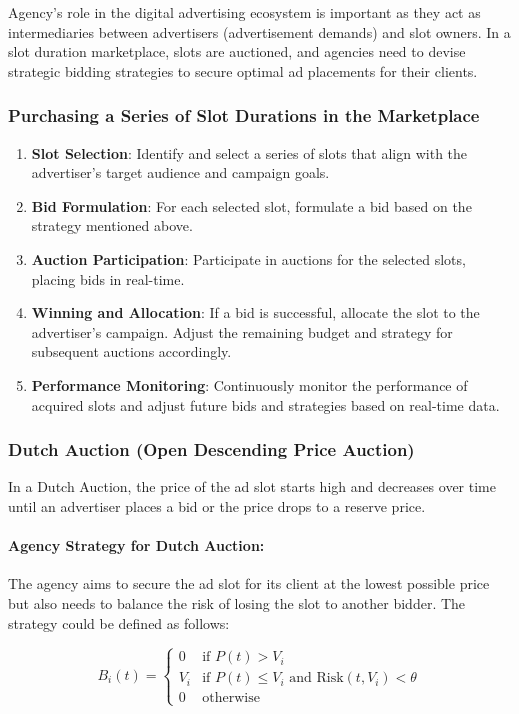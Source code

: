 Agency’s role in the digital advertising ecosystem is important as they act as intermediaries between advertisers (advertisement demands) and slot owners. In a slot duration marketplace, slots are auctioned, and agencies need to devise strategic bidding strategies to secure optimal ad placements for their clients.


\subsubsection{Purchasing a Series of Slot Durations in the Marketplace}

\begin{enumerate}
    \item \textbf{Slot Selection}: Identify and select a series of slots that align with the advertiser’s target audience and campaign goals.
    \item \textbf{Bid Formulation}: For each selected slot, formulate a bid based on the strategy mentioned above.
    \item \textbf{Auction Participation}: Participate in auctions for the selected slots, placing bids in real-time.
    \item \textbf{Winning and Allocation}: If a bid is successful, allocate the slot to the advertiser’s campaign. Adjust the remaining budget and strategy for subsequent auctions accordingly.
    \item \textbf{Performance Monitoring}: Continuously monitor the performance of acquired slots and adjust future bids and strategies based on real-time data.
\end{enumerate}


\subsubsection{Dutch Auction (Open Descending Price Auction)}
In a Dutch Auction, the price of the ad slot starts high and decreases over time until an advertiser places a bid or the price drops to a reserve price.

\paragraph{Agency Strategy for Dutch Auction:} 
The agency aims to secure the ad slot for its client at the lowest possible price but also needs to balance the risk of losing the slot to another bidder. The strategy could be defined as follows:

\[
B_i(t) = 
\begin{cases} 
0 & \text{if } P(t) > V_i \\
V_i & \text{if } P(t) \leq V_i \text{ and } \text{Risk}(t, V_i) < \theta \\
0 & \text{otherwise}
\end{cases}
\]

